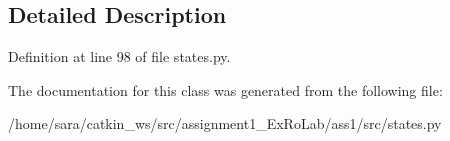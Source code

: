 \subsection{Detailed Description}


Definition at line 98 of file states.\+py.



The documentation for this class was generated from the following file\+:\begin{DoxyCompactItemize}
\item 
/home/sara/catkin\+\_\+ws/src/assignment1\+\_\+\+Ex\+Ro\+Lab/ass1/src/states.\+py\end{DoxyCompactItemize}
